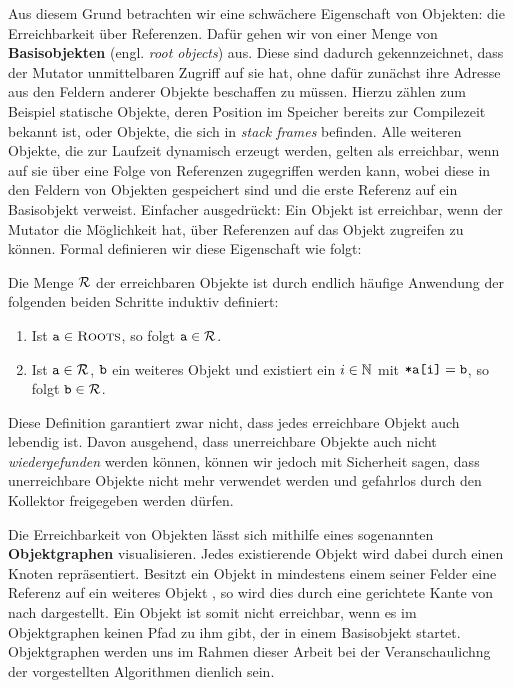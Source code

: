 Aus diesem Grund betrachten wir eine schwächere Eigenschaft von Objekten: die Erreichbarkeit über Referenzen.
Dafür gehen wir von einer Menge \Roots von \textbf{Basisobjekten} (engl. \textit{root objects}) aus.
Diese sind dadurch gekennzeichnet, dass der Mutator unmittelbaren Zugriff auf sie hat, ohne dafür zunächst ihre Adresse aus den Feldern anderer Objekte beschaffen zu müssen.
Hierzu zählen zum Beispiel statische Objekte, deren Position im Speicher bereits zur Compilezeit bekannt ist, oder Objekte, die sich in \textit{stack frames} befinden.
Alle weiteren Objekte, die zur Laufzeit dynamisch erzeugt werden, gelten als erreichbar, wenn auf sie über eine Folge von Referenzen zugegriffen werden kann, wobei diese in den Feldern von Objekten gespeichert sind und die erste Referenz auf ein Basisobjekt verweist.
Einfacher ausgedrückt: Ein Objekt ist erreichbar, wenn der Mutator die Möglichkeit hat, über Referenzen auf das Objekt zugreifen zu können.
Formal definieren wir diese Eigenschaft wie folgt:

\begin{mybox}
\begin{defn}[Erreichbarkeit]
	\label{def:erreichbar}
	Die Menge $\mathcal{R}$ der erreichbaren Objekte ist durch endlich häufige Anwendung der folgenden beiden Schritte induktiv definiert:
	\begin{enumerate}[(1)]
		\item Ist $\texttt{a} \in \textsc{Roots}$, so folgt $\texttt{a} \in \mathcal{R}$.
		\item Ist $\texttt{a} \in \mathcal{R}$, $\texttt{b}$ ein weiteres Objekt und existiert ein $i \in \mathbb{N}$ mit $\texttt{*a[i]} = \texttt{b}$, so folgt $\texttt{b} \in \mathcal{R}$.
	\end{enumerate}
\end{defn}
\end{mybox}

Diese Definition garantiert zwar nicht, dass jedes erreichbare Objekt auch lebendig ist.
Davon ausgehend, dass unerreichbare Objekte auch nicht \textit{wiedergefunden} werden können, können wir jedoch mit Sicherheit sagen, dass unerreichbare Objekte nicht mehr verwendet werden und gefahrlos durch den Kollektor freigegeben werden dürfen.

Die Erreichbarkeit von Objekten lässt sich mithilfe eines sogenannten \textbf{Objektgraphen} visualisieren.
Jedes existierende Objekt wird dabei durch einen Knoten repräsentiert.
Besitzt ein Objekt  in mindestens einem seiner Felder eine Referenz auf ein weiteres Objekt , so wird dies durch eine gerichtete Kante von  nach  dargestellt.
Ein Objekt ist somit nicht erreichbar, wenn es im Objektgraphen keinen Pfad zu ihm gibt, der in einem Basisobjekt startet.
Objektgraphen werden uns im Rahmen dieser Arbeit bei der Veranschaulichng der vorgestellten Algorithmen dienlich sein.

